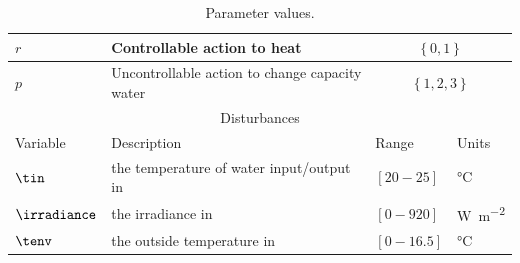 \begin{table}
\begin{tabular}{ |p{2cm}||p{6cm}|p{2cm}|p{2cm}|  }
    \hline
    $r$ & Controllable action to heat & \multicolumn{2}{|c|}{$\left\lbrace 0,1 \right\rbrace$}\\
    \hline
    $p$ & Uncontrollable action to change capacity water & \multicolumn{2}{|c|}{$\left\lbrace 1,2,3 \right\rbrace$}\\
    \hline         
    \multicolumn{4}{|c|}{Disturbances} \\
    \hline
    Variable& Description & Range&Units\\        
    \hline
    $\tin$ & the temperature of water input/output in & $[20-25]$ & \si{\degreeCelsius} \\
    $\irradiance$ & the irradiance in & $[0-920]$ & \si{\watt\per\square\metre}    \\
    $\tenv$ & the outside temperature in & $[0-16.5]$ & \si{\degreeCelsius} \\
    \hline
\end{tabular}
\caption{Parameter values.}
\end{table}






